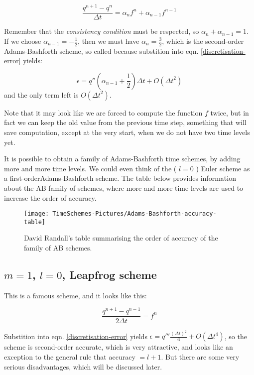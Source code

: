 \begin{equation}
	\frac{q^{n+1}-q^n}{\Delta t} = \alpha_n f^n + \alpha_{n-1} f^{n-1}
	\label{2nd-order-BA}
\end{equation}

Remember that the \emph{consistency condition} must be respected, so $\alpha_n + \alpha_{n-1}=1$. If we choose $\alpha_{n-1} = -\frac{1}{2}$, then we must have $\alpha_{n} = \frac{3}{2}$, which is the second-order Adams-Bashforth scheme, so called because substition into eqn. \ref{discretisation-error} yields: 

\begin{equation}
	\epsilon = q'' \left( \alpha_{n-1} + \frac{1}{2} \right) \Delta t + O({\Delta t}^2)
\end{equation}
and the only term left is $O({\Delta t}^2)$.

Note that it may look like we are forced to compute the function $f$ twice, but in fact we can keep the old value from the previous time step, something that will save computation, except at the very start, when we do not have two time levels yet.

It is possible to obtain a family of Adams-Bashforth time schemes, by adding more and more time levels. We could even think of the ( $l=0$ ) Euler scheme as a first-orderAdams-Bashforth scheme. The table below provides information about the AB family of schemes, where more and more time levels are used to increase the order of accuracy.

\begin{figure}[h!]
	\texttt{[image: TimeSchemes-Pictures/Adams-Bashforth-accuracy-table]}
	\caption{David Randall's table summarising the order of accuracy of the family of AB schemes.}
	\label{fig:Adams-Bashforth-accuracy-table}
\end{figure}

\subsection{$m=1$, $l=0$, Leapfrog scheme}
This is a famous scheme, and it looks like this: 

\begin{equation}
	\frac{q^{n+1}-q^{n-1}}{2 \Delta t} = f^n
	\label{Leapfrog}
\end{equation}

Substition into eqn. \ref{discretisation-error} yields $\epsilon = q'''\frac{(\Delta t)^2}{6} + O({\Delta t}^4)$, so the scheme is second-order accurate, which is very attractive, and looks like an exception to the general rule that accuracy $=l+1$. But there are some very serious disadvantages, which will be discussed later.

